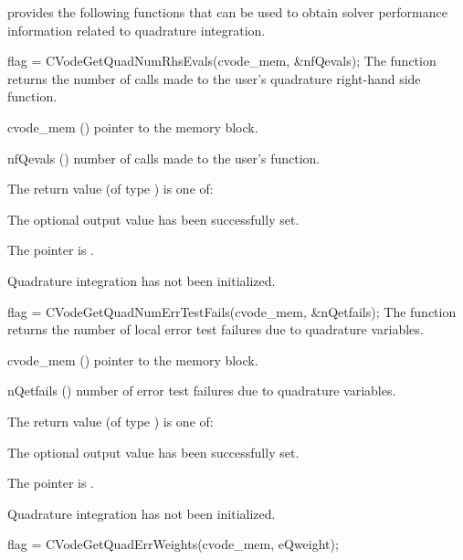 {\cvodes} provides the following functions that can be used to obtain solver
performance information related to quadrature integration.

{
  flag = CVodeGetQuadNumRhsEvals(cvode\_mem, \&nfQevals);
}
{
  The function  returns the 
  number of calls made to the user's quadrature right-hand side function.
}
{
  \begin{args}
  \item[cvode\_mem] ()
    pointer to the {\cvodes} memory block.
  \item[nfQevals] ()
    number of calls made to the user's  function.
  \end{args}
}
{
  The return value  (of type ) is one of:
  \begin{args}
  \item[\Id{CV\_SUCCESS}] 
    The optional output value has been successfully set.
  \item[\Id{CV\_MEM\_NULL}]
    The  pointer is .
  \item[\Id{CV\_NO\_QUAD}]
    Quadrature integration has not been initialized.
  \end{args}
}
{}
{
  flag = CVodeGetQuadNumErrTestFails(cvode\_mem, \&nQetfails);
}
{
  The function  returns the
  number of local error test failures due to quadrature variables.
}
{
  \begin{args}
  \item[cvode\_mem] ()
    pointer to the {\cvodes} memory block.
  \item[nQetfails] ()
    number of error test failures due to quadrature variables.
  \end{args}
}
{
  The return value  (of type ) is one of:
  \begin{args}
  \item[\Id{CV\_SUCCESS}] 
    The optional output value has been successfully set.
  \item[\Id{CV\_MEM\_NULL}]
    The  pointer is .
  \item[\Id{CV\_NO\_QUAD}]
    Quadrature integration has not been initialized.
  \end{args}
}
{}
{
  flag = CVodeGetQuadErrWeights(cvode\_mem, eQweight);
}
